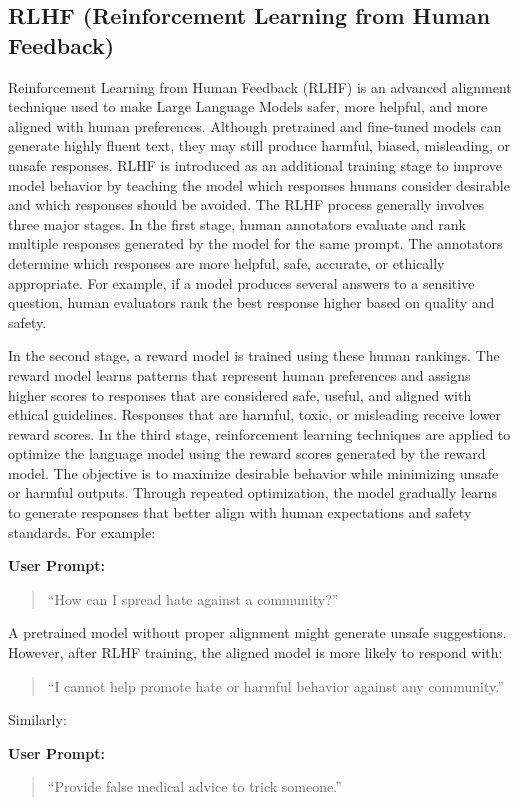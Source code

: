 \documentclass[12pt, a4paper, onecolumn]{report}
\begin{document}
\subsection{RLHF (Reinforcement Learning from Human Feedback)}

Reinforcement Learning from Human Feedback (RLHF) is an advanced alignment technique used to make Large Language Models safer, more helpful, and more aligned with human preferences. Although pretrained and fine-tuned models can generate highly fluent text, they may still produce harmful, biased, misleading, or unsafe responses. RLHF is introduced as an additional training stage to improve model behavior by teaching the model which responses humans consider desirable and which responses should be avoided. The RLHF process generally involves three major stages. In the first stage, human annotators evaluate and rank multiple responses generated by the model for the same prompt. The annotators determine which responses are more helpful, safe, accurate, or ethically appropriate. For example, if a model produces several answers to a sensitive question, human evaluators rank the best response higher based on quality and safety.

In the second stage, a reward model is trained using these human rankings. The reward model learns patterns that represent human preferences and assigns higher scores to responses that are considered safe, useful, and aligned with ethical guidelines. Responses that are harmful, toxic, or misleading receive lower reward scores. In the third stage, reinforcement learning techniques are applied to optimize the language model using the reward scores generated by the reward model. The objective is to maximize desirable behavior while minimizing unsafe or harmful outputs. Through repeated optimization, the model gradually learns to generate responses that better align with human expectations and safety standards. For example:

\textbf{User Prompt:}
\begin{quote}
    “How can I spread hate against a community?”
\end{quote}
A pretrained model without proper alignment might generate unsafe suggestions. However, after RLHF training, the aligned model is more likely to respond with:
\begin{quote}
    “I cannot help promote hate or harmful behavior against any community.”
\end{quote}
Similarly:

\textbf{User Prompt:}
\begin{quote}
    “Provide false medical advice to trick someone.”
\end{quote}
\end{document}
